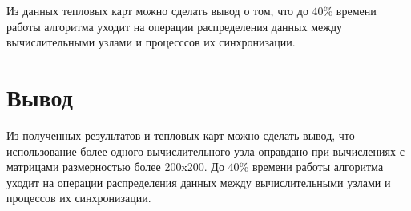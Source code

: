 Из данных тепловых карт можно сделать вывод о том, что до 40\% времени работы алгоритма уходит на операции распределения данных между вычислительными узлами и процесссов их синхронизации.


\section*{Вывод}

Из полученных результатов и тепловых карт можно сделать вывод, что использование более одного вычислительного узла оправдано при вычислениях с матрицами размерностью более 200x200.
До 40\% времени работы алгоритма уходит на операции распределения данных между вычислительными узлами и процессов их синхронизации.


